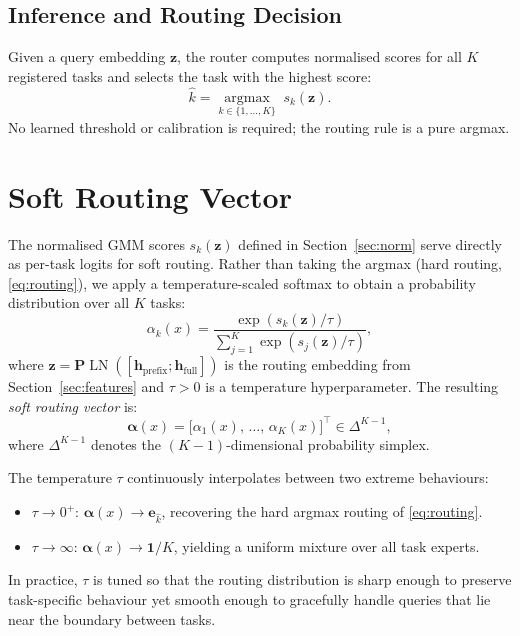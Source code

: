 \documentclass[12pt,a4paper]{article}
\begin{document}
\subsection{Inference and Routing Decision}

Given a query embedding $\mathbf{z}$, the router computes normalised scores for all $K$ registered tasks and selects the task with the highest score:
\begin{equation}
    \hat{k} = \operatorname*{argmax}_{k \in \{1,\ldots,K\}} \; s_k(\mathbf{z}).
    \label{eq:routing}
\end{equation}
No learned threshold or calibration is required; the routing rule is a pure argmax.

\section{Soft Routing Vector}
\label{sec:soft_routing}

The normalised GMM scores $s_k(\mathbf{z})$ defined in Section~\ref{sec:norm} serve directly as per-task logits for soft routing.
Rather than taking the argmax (hard routing, \eqref{eq:routing}), we apply a temperature-scaled softmax to obtain a probability distribution over all $K$ tasks:
\begin{equation}
    \alpha_k(x) = \frac{\exp\!\left(s_k(\mathbf{z}) / \tau\right)}{\displaystyle\sum_{j=1}^K \exp\!\left(s_j(\mathbf{z}) / \tau\right)},
    \label{eq:alpha}
\end{equation}
where $\mathbf{z} = \mathbf{P}\operatorname{LN}([\mathbf{h}_{\mathrm{prefix}}; \mathbf{h}_{\mathrm{full}}])$ is the routing embedding from Section~\ref{sec:features} and $\tau > 0$ is a temperature hyperparameter.
The resulting \emph{soft routing vector} is:
\begin{equation}
    \bm{\alpha}(x) = \bigl[\alpha_1(x),\, \ldots,\, \alpha_K(x)\bigr]^\top \in \Delta^{K-1},
    \label{eq:alpha_vec}
\end{equation}
where $\Delta^{K-1}$ denotes the $(K{-}1)$-dimensional probability simplex.

The temperature $\tau$ continuously interpolates between two extreme behaviours:
\begin{itemize}[noitemsep]
    \item $\tau \to 0^+$: $\bm{\alpha}(x) \to \mathbf{e}_{\hat{k}}$, recovering the hard argmax routing of \eqref{eq:routing}.
    \item $\tau \to \infty$: $\bm{\alpha}(x) \to \mathbf{1}/K$, yielding a uniform mixture over all task experts.
\end{itemize}
In practice, $\tau$ is tuned so that the routing distribution is sharp enough to preserve task-specific behaviour yet smooth enough to gracefully handle queries that lie near the boundary between tasks.
\end{document}
